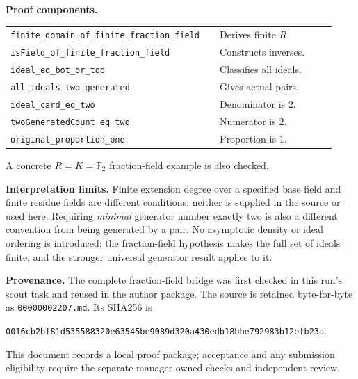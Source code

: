 \documentclass[11pt]{article}
\begin{document}
\medskip
\noindent\textbf{Proof components.}
\begin{center}
\small
\begin{tabular}{@{}p{0.61\linewidth}p{0.34\linewidth}@{}}
\texttt{finite\_domain\_of\_finite\_fraction\_field} & Derives finite $R$.\\
\texttt{isField\_of\_finite\_fraction\_field} & Constructs inverses.\\
\texttt{ideal\_eq\_bot\_or\_top} & Classifies all ideals.\\
\texttt{all\_ideals\_two\_generated} & Gives actual pairs.\\
\texttt{ideal\_card\_eq\_two} & Denominator is $2$.\\
\texttt{twoGeneratedCount\_eq\_two} & Numerator is $2$.\\
\texttt{original\_proportion\_one} & Proportion is $1$.
\end{tabular}
\end{center}
A concrete $R=K=\mathbb F_2$ fraction-field example is also checked.

\medskip
\noindent\textbf{Interpretation limits.}
Finite extension degree over a specified base field and finite residue fields
are different conditions; neither is supplied in the source or used here.
Requiring \emph{minimal} generator number exactly two is also a different
convention from being generated by a pair. No asymptotic density or ideal
ordering is introduced: the fraction-field hypothesis makes the full set of
ideals finite, and the stronger universal generator result applies to it.

\medskip
\noindent\textbf{Provenance.}
The complete fraction-field bridge was first checked in this run's scout
task and reused in the author package. The source is retained byte-for-byte
as \texttt{00000002207.md}. Its SHA256 is
\begin{center}
\small\texttt{0016cb2bf81d535588320e63545be9089d320a430edb18bbe792983b12efb23a}.
\end{center}
This document records a local proof package; acceptance and any submission
eligibility require the separate manager-owned checks and independent review.
\end{document}
